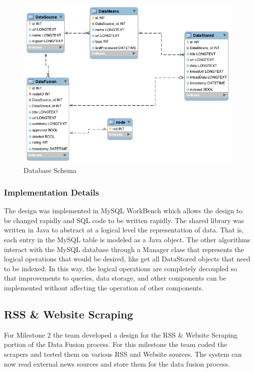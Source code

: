 \documentclass[12pt]{article} %
\begin{document}
\begin{figure}[htbp]
\begin{center}
\includegraphics[width=6in]{images/database_schema}
\caption{Database Schema}
\end{center}
\end{figure}

\subsubsection{Implementation Details}

The design was implemented in MySQL WorkBench which allows the design to be changed rapidly and SQL code to be written rapidly. The shared library was written in Java to abstract at a logical level the representation of data. That is, each entry in the MySQL table is modeled as a Java object. The other algorithms interact with the MySQL database through a Manager class that represents the logical operations that would be desired, like get all DataStored objects that need to be indexed. In this way, the logical operations are completely decoupled so that improvements to queries, data storage, and other components can be implemented without affecting the operation of other components.

\subsection{RSS \& Website Scraping}

For Milestone 2 the team developed a design for the RSS \& Website Scraping portion of the Data Fusion process. For this milestone the team coded the scrapers and tested them on various RSS and Website sources. The system can now read external news sources and store them for the data fusion process.
\end{document}
